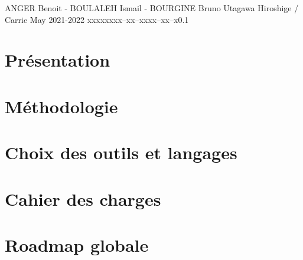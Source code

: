 \documentclass{tstextbook}
\begin{document}
       {ANGER Benoit - BOULALEH Ismail - BOURGINE Bruno}
       {Utagawa Hiroshige / Carrie May}
       {2021-2022}
       {xxxxx}{xxx--xx--xxxx--xx--x}{0.1}
       {}
       {}



\chapter{Présentation}


\chapter{Méthodologie}


\chapter{Choix des outils et langages}


\chapter{Cahier des charges}


% 

\chapter{Roadmap globale}


% 

% 

% 

% 

\end{document}
